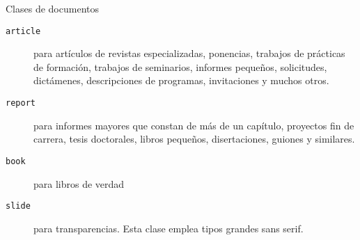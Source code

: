 \begin{table}[!bp]
\caption{Clases de documentos} \label{documentclasses}
\begin{lined}{12cm}
\begin{description}

\item   [\normalfont\texttt{article}]  para   artículos  de   revistas
especializadas,  ponencias,   trabajos  de  prácticas   de  formación,
trabajos    de    seminarios,    informes    pequeños,    solicitudes,
dictámenes,    descripciones    de     programas,    invitaciones    y
muchos   otros.%

\item   [\normalfont\texttt{report}]   para   informes   mayores   que
constan    de    más    de    un   capítulo,    proyectos    fin    de
carrera,   tesis    doctorales,   libros    pequeños,   disertaciones,
guiones      y     similares.

\item       [\normalfont\texttt{book}]       para      libros       de
verdad

\item    [\normalfont\texttt{slide}]    para   transparencias.    Esta
clase      emplea     tipos      grandes     \textsf{sans      serif}.

\end{description}

\end{lined}
\end{table}

